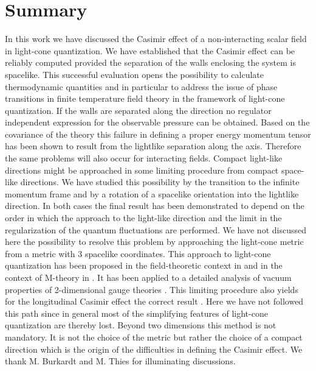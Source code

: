 \documentclass[a4paper,twocolumn,eqsecnum,aps]{revtex4}
\begin{document}
\section{Summary}
In this work we have discussed the Casimir effect of a non-interacting scalar field in light-cone quantization. We have established that the Casimir effect can be reliably computed provided the separation of the walls enclosing the system is  spacelike. This successful evaluation opens the possibility to calculate thermodynamic quantities  and in particular to address the issue of phase transitions in finite temperature field theory in the framework of light-cone quantization. If the walls are separated along the \coordHE{} direction no regulator independent expression for the observable pressure can be obtained. Based on the covariance of the theory  this failure in defining a proper energy momentum tensor has been shown to result from the  lightlike separation along the \coordHE{} axis. Therefore the same problems will  also occur for interacting fields. Compact  light-like directions might be approached in some limiting procedure from compact space-like directions. We have studied this possibility by the transition to the infinite momentum frame and by a rotation of a spacelike orientation into the lightlike direction. In both cases the final result has been demonstrated to depend on the order in which the approach to the light-like direction and the limit in the regularization of the quantum fluctuations are performed. We have not discussed here the possibility to resolve this problem by approaching the light-cone metric from a metric with 3 spacelike coordinates. This approach to light-cone quantization has been proposed in the field-theoretic context in \cite{FR,ltly91} and in the context of M-theory in \cite{POL99,bilal1,bilal2}. It has been applied  to a detailed analysis of vacuum properties of 2-dimensional gauge theories \cite{ltly91}. This limiting procedure  also yields for the longitudinal Casimir effect the correct result \cite{Stei01}. Here we have not followed this path since in general   most of  the simplifying features of light-cone quantization are thereby lost.  Beyond two dimensions this method is not mandatory. It is not the choice of the metric  but rather the choice of a compact \coordHE{} direction which is the origin of the difficulties in defining the  Casimir effect.  
\vskip 0.5cm
We thank M. Burkardt and M. Thies for illuminating discussions.
\vskip 0.5cm 
\end{document}
